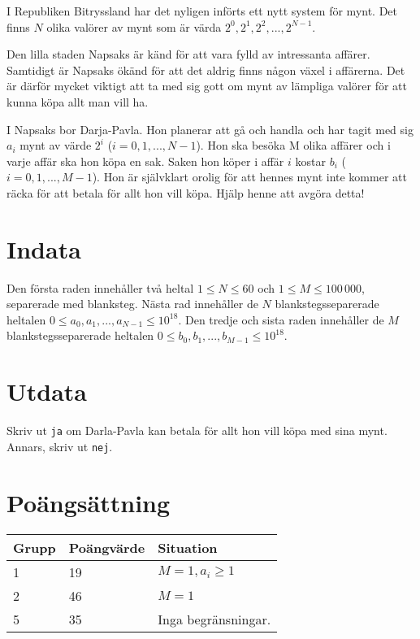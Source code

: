 I Republiken Bitryssland har det nyligen införts ett nytt system för mynt.
Det finns $N$ olika valörer av mynt som är värda $2^0, 2^1, 2^2, ..., 2^{N-1}$. 

Den lilla staden Napsaks är känd för att vara fylld av intressanta affärer.
Samtidigt är Napsaks ökänd för att det aldrig finns någon växel i affärerna.
Det är därför mycket viktigt att ta med sig gott om mynt av lämpliga valörer för att kunna köpa allt man vill ha. 

I Napsaks bor Darja-Pavla.
Hon planerar att gå och handla och har tagit med sig $a_i$ mynt av värde $2^i$ ($i = 0, 1, ..., N-1$).
Hon ska besöka M olika affärer och i varje affär ska hon köpa en sak.
Saken hon köper i affär $i$ kostar $b_i$ ($i = 0, 1, ..., M-1$).
Hon är självklart orolig för att hennes mynt inte kommer att räcka för att betala för allt hon vill köpa. Hjälp henne att avgöra detta!

\section*{Indata}
Den första raden innehåller två heltal $1 \le N \le 60$ och $1 \le M \le 100\,000$, separerade med blanksteg.
Nästa rad innehåller de $N$ blankstegsseparerade heltalen $0 \le a_0, a_1, ..., a_{N-1} \le 10^{18}$.
Den tredje och sista raden innehåller de $M$ blankstegsseparerade heltalen $0 \le b_0, b_1, ..., b_{M-1} \le 10^{18}$.

\section*{Utdata}
Skriv ut \texttt{ja} om Darla-Pavla kan betala för allt hon vill köpa med sina mynt.
Annars, skriv ut \texttt{nej}.

\section*{Poängsättning}
\begin{tabular}{| l | l | l |}
\hline
Grupp & Poängvärde & Situation \\ \hline
1     & 19         & $M = 1, a_i \ge 1$ \\ \hline
2     & 46         & $M = 1$ \\ \hline
5     & 35         & Inga begränsningar. \\ \hline
\end{tabular}
